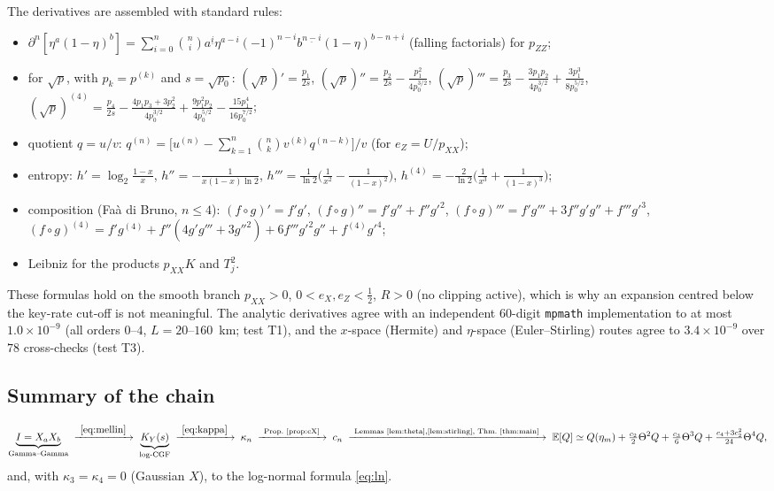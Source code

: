The derivatives are assembled with standard rules:
\begin{itemize}
\item $\partial^n[\eta^a(1-\eta)^b]=\sum_{i=0}^{n}\binom ni a^{\underline i}\eta^{a-i}(-1)^{n-i}b^{\underline{n-i}}(1-\eta)^{b-n+i}$ (falling factorials) for $p_{ZZ}$;
\item for $\sqrt p$, with $p_k=p^{(k)}$ and $s=\sqrt{p_0}$:
$(\sqrt p)'=\tfrac{p_1}{2s}$,\;
$(\sqrt p)''=\tfrac{p_2}{2s}-\tfrac{p_1^2}{4p_0^{3/2}}$,\;
$(\sqrt p)'''=\tfrac{p_3}{2s}-\tfrac{3p_1p_2}{4p_0^{3/2}}+\tfrac{3p_1^3}{8p_0^{5/2}}$,\;
$(\sqrt p)^{(4)}=\tfrac{p_4}{2s}-\tfrac{4p_1p_3+3p_2^2}{4p_0^{3/2}}+\tfrac{9p_1^2p_2}{4p_0^{5/2}}-\tfrac{15p_1^4}{16p_0^{7/2}}$;
\item quotient $q=u/v$: $q^{(n)}=\big[u^{(n)}-\sum_{k=1}^{n}\binom nk v^{(k)}q^{(n-k)}\big]/v$ (for $e_Z=U/p_{XX}$);
\item entropy: $h'=\log_2\frac{1-x}{x}$, $h''=-\frac{1}{x(1-x)\ln2}$, $h'''=\frac1{\ln2}\big(\frac1{x^2}-\frac1{(1-x)^2}\big)$, $h^{(4)}=-\frac2{\ln2}\big(\frac1{x^3}+\frac1{(1-x)^3}\big)$;
\item composition (Fa\`a di Bruno, $n\le4$): $(f\!\circ\! g)'=f'g'$, $(f\!\circ\! g)''=f'g''+f''g'^2$, $(f\!\circ\! g)'''=f'g'''+3f''g'g''+f'''g'^3$, $(f\!\circ\! g)^{(4)}=f'g^{(4)}+f''(4g'g'''+3g''^2)+6f'''g'^2g''+f^{(4)}g'^4$;
\item Leibniz for the products $p_{XX}K$ and $T_j^2$.
\end{itemize}
These formulas hold on the smooth branch $p_{XX}>0$, $0<e_X,e_Z<\tfrac12$, $R>0$ (no clipping active), which is why an expansion centred below the key-rate cut-off is not meaningful.
The analytic derivatives agree with an independent 60-digit \texttt{mpmath} implementation to at most $1.0\times10^{-9}$ (all orders $0$--$4$, $L=20$--$160$~km; test T1), and the $x$-space (Hermite) and $\eta$-space (Euler--Stirling) routes agree to $3.4\times10^{-9}$ over $78$ cross-checks (test T3).

\subsection{Summary of the chain}
\[
\underbrace{I=X_aX_b}_{\text{Gamma--Gamma}}
\;\xrightarrow{\ \eqref{eq:mellin}\ }\;
\underbrace{K_Y(s)}_{\text{log-CGF}}
\;\xrightarrow{\ \eqref{eq:kappa}\ }\;
\kappa_n
\;\xrightarrow{\ \text{Prop.~\ref{prop:cX}}\ }\;
c_n
\;\xrightarrow{\ \text{Lemmas~\ref{lem:theta},\ref{lem:stirling}, Thm.~\ref{thm:main}}\ }\;
\mathbb E[Q]\simeq Q(\eta_m)+\tfrac{c_2}{2}\Theta^2Q+\tfrac{c_3}{6}\Theta^3Q+\tfrac{c_4+3c_2^2}{24}\Theta^4Q ,
\]
and, with $\kappa_3=\kappa_4=0$ (Gaussian $X$), to the log-normal formula \eqref{eq:ln}.
